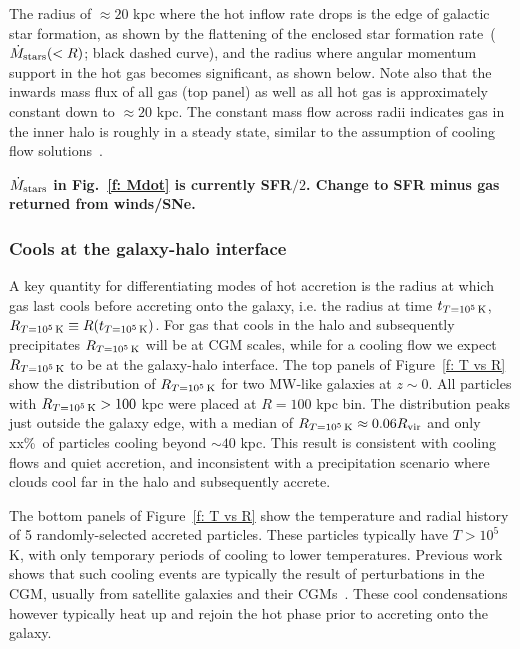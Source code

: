 \documentclass[fleqn,usenatbib]{mnras}
\newcommand{\Rcon}{R_{T=10^5\,{\rm K}}}
\newcommand{\tcon}{t_{T=10^5\,{\rm K}}}
\begin{document}
The radius of $\approx 20$ kpc where the hot inflow rate drops is the edge of galactic star formation, as shown by the flattening of the enclosed star formation rate~($\dot M_{\rm stars}(<R)$; black dashed curve), and the radius where angular momentum support in the hot gas becomes significant, as shown below. 
Note also that the inwards mass flux of all gas (top panel) as well as all hot gas is approximately constant down to $\approx 20$ kpc.
The constant mass flow across radii indicates gas in the inner halo is roughly in a steady state, similar to the assumption of cooling flow solutions~\citep{Stern2019}.

\textbf{$\dot{M}_{\rm stars}$ in Fig.~\ref{f: Mdot} is currently SFR$/2$. Change to SFR minus gas returned from winds/SNe.}

\subsubsection{Cools at the galaxy-halo interface}
\label{s: characteristics -- cools}

A key quantity for differentiating modes of hot accretion is the radius at which gas last cools before accreting onto the galaxy, i.e. the radius at time $\tcon$, $\Rcon \equiv R (\tcon)$.
For gas that cools in the halo and subsequently precipitates $\Rcon$ will be at CGM scales, while for a cooling flow we expect $\Rcon$ to be at the galaxy-halo interface.
The top panels of Figure~\ref{f: T vs R} show the distribution of $\Rcon$ for two MW-like galaxies at $z\sim0$.
All particles with $\Rcon>100$ kpc were placed at $R=100$ kpc bin. 
The distribution peaks just outside the galaxy edge, with a median of $\Rcon \approx 0.06 R_{\rm vir}$ and only xx\%\ of particles cooling beyond $\sim 40$ kpc.
This result is consistent with cooling flows and quiet accretion, and inconsistent with a precipitation scenario where clouds cool far in the halo and subsequently accrete.

The bottom panels of Figure~\ref{f: T vs R} show the temperature and radial history of 5 randomly-selected accreted particles.
These particles typically have $T>10^5$ K, with only temporary periods of cooling to lower temperatures.
Previous work shows that such cooling events are typically the result of perturbations in the CGM, usually from satellite galaxies and their CGMs~\citep{Esmerian2020}.
These cool condensations however typically heat up and rejoin the hot phase prior to accreting onto the galaxy. 
\end{document}
